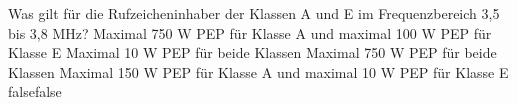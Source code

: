     {Was gilt für die Rufzeicheninhaber der Klassen A und E im Frequenzbereich 3,5 bis 3,8 MHz?}
    {Maximal 750 W PEP für Klasse A und maximal 100 W PEP für Klasse E}
    {Maximal 10 W PEP für beide Klassen}
    {Maximal 750 W PEP für beide Klassen}
    {Maximal 150 W PEP für Klasse A und maximal 10 W PEP für Klasse E}
    {false}{false}